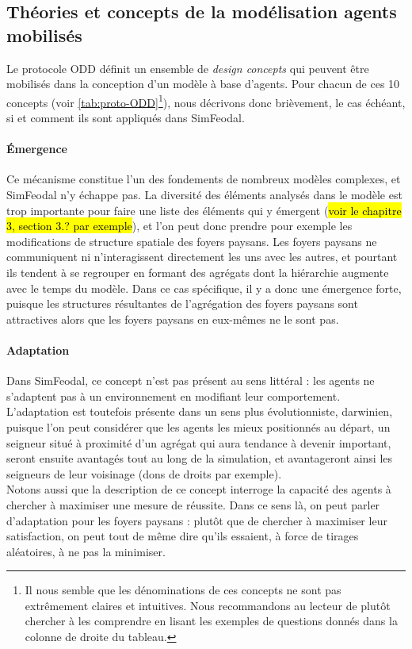 \subsection{Théories et concepts de la modélisation agents mobilisés}

Le protocole ODD définit un ensemble de \textit{design concepts} qui peuvent être mobilisés dans la conception d'un modèle à base d'agents. Pour chacun de ces 10 concepts (voir \cref{tab:proto-ODD}\footnote{
Il nous semble que les dénominations de ces concepts ne sont pas extrêmement claires et intuitives. Nous recommandons au lecteur de plutôt chercher à les comprendre en lisant les exemples de questions donnés dans la colonne de droite du tableau.
}), nous décrivons donc brièvement, le cas échéant, si et comment ils sont appliqués dans SimFeodal.

\paragraph{Émergence} Ce mécanisme constitue l'un des fondements de nombreux modèles complexes, et SimFeodal n'y échappe pas. La diversité des éléments analysés dans le modèle est trop importante pour faire une liste des éléments qui y émergent (\hl{voir le chapitre 3, section 3.? par exemple}), et l'on peut donc prendre pour exemple les modifications de structure spatiale des foyers paysans.
Les foyers paysans ne communiquent ni n'interagissent directement les uns avec les autres, et pourtant ils tendent à se regrouper en formant des agrégats dont la hiérarchie augmente avec le temps du modèle. Dans ce cas spécifique, il y a donc une émergence \og forte\fg{}, puisque les structures résultantes de l'agrégation des foyers paysans sont attractives alors que les foyers paysans en eux-mêmes ne le sont pas.

\paragraph{Adaptation} Dans SimFeodal, ce concept n'est pas présent au sens littéral : les agents ne s'adaptent pas à un environnement en modifiant leur comportement. L'adaptation est toutefois présente dans un sens plus évolutionniste, darwinien, puisque l'on peut considérer que les agents les mieux positionnés au départ, un seigneur situé à proximité d'un agrégat qui aura tendance à devenir important, seront ensuite avantagés tout au long de la simulation, et avantageront ainsi les seigneurs de leur voisinage (dons de droits par exemple).\\
Notons aussi que la description de ce concept interroge la capacité des agents à chercher à maximiser une mesure de réussite.
Dans ce sens là, on peut parler d'adaptation pour les foyers paysans : plutôt que de chercher à maximiser leur satisfaction, on peut tout de même dire qu'ils essaient, à force de tirages aléatoires, à ne pas la minimiser.


